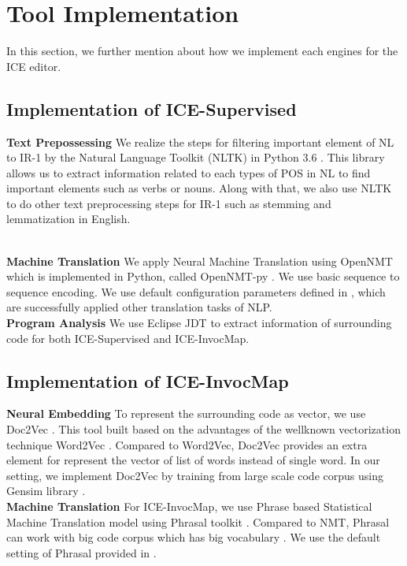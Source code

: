 \documentclass[sigconf,review]{acmart}
\begin{document}
\section{Tool Implementation}
In this section, we further mention about how we implement each engines for the ICE editor.
\subsection{Implementation of ICE-Supervised}
\textbf{Text Prepossessing} We realize the steps for filtering important element of NL to IR-1 by the Natural Language Toolkit (NLTK) in Python 3.6 \cite{039}. This library allows us to extract information related to each types of POS in NL to find important elements such as verbs or nouns. Along with that, we also use NLTK to do other text preprocessing steps for IR-1 such as stemming and lemmatization in English.

\\
\textbf{Machine Translation} We apply Neural Machine Translation using OpenNMT which is implemented in Python, called OpenNMT-py \cite{038}. We use basic sequence to sequence encoding. We use default configuration parameters defined in \cite{038}, which are successfully applied other translation tasks of NLP.
\\
\textbf{Program Analysis} We use Eclipse JDT \cite{040} to extract information of surrounding code for both ICE-Supervised and ICE-InvocMap.

\subsection{Implementation of ICE-InvocMap}
\textbf{Neural Embedding} To represent the surrounding code as vector, we use Doc2Vec \cite{002}. This tool built based on the advantages of the wellknown vectorization technique Word2Vec \cite{014}. Compared to Word2Vec, Doc2Vec provides an extra element for represent the vector of list of words instead of single word. In our setting, we implement Doc2Vec by training from large scale code corpus using Gensim library \cite{023}.
\\
\textbf{Machine Translation} For ICE-InvocMap, we use Phrase based Statistical Machine Translation model using Phrasal toolkit \cite{015,016}. Compared to NMT, Phrasal can work with big code corpus which has big vocabulary \cite{013}. We use the default setting of Phrasal provided in \cite{015}.
\end{document}
